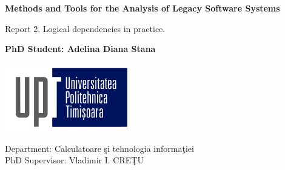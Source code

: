 \begin{titlepage}
    \begin{center}
        \vspace*{1cm}
        \large
        \textbf{Methods and Tools for the Analysis of Legacy Software Systems}
            
        \vspace{0.5cm}
        Report 2. Logical dependencies in practice.
            
        \vspace{1.5cm}
            
        \textbf{PhD Student: Adelina Diana Stana}
            
        \vfill
            
        \vspace{0.8cm}
            
        \includegraphics[width=0.4\textwidth]{Logo-UPT.jpg}

        Department: Calculatoare şi tehnologia informaţiei\\
        PhD Supervisor: Vladimir I. CREŢU\\
            
    \end{center}
\end{titlepage}


